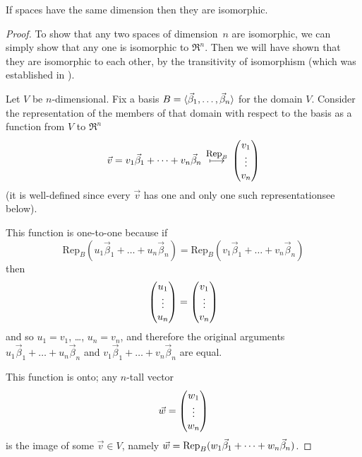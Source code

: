 \begin{lemma} \label{lem:EqDimImpIso}
If spaces have the same dimension then they are isomorphic. 
\end{lemma}

\begin{proof}
To show that any two spaces of dimension~$n$ are isomorphic, 
we can simply show that any one is isomorphic to $\Re^n$.
Then we will have shown that they are isomorphic to each other, 
by the transitivity of isomorphism 
(which was established in ).

Let $V$ be \( n \)-dimensional.
Fix a basis
\( B=\sequence{\vec{\beta}_1,\dots,\vec{\beta}_n} \) for the domain $V$.
Consider the representation of the 
members of that domain with respect to the basis as a function
from $V$ to $\Re^n$ 
\begin{equation*}
   \vec{v}=v_1\vec{\beta}_1+\dots+v_n\vec{\beta}_n
   \,\mapsunder{\text{\small Rep}_B}\,\colvec{v_1 \\ \vdots \\ v_n}
\end{equation*}
(it is well-defined since 
every \( \vec{v} \) 
has one and only one such representation\Dash see 
below).

This function is one-to-one because if
\begin{equation*}
   \text{Rep}_B(u_1\vec{\beta}_1+\dots+u_n\vec{\beta}_n)
     =\text{Rep}_B(v_1\vec{\beta}_1+\dots+v_n\vec{\beta}_n)
\end{equation*}
then
\begin{equation*}
  \colvec{u_1 \\ \vdots \\ u_n}
    =
  \colvec{v_1 \\ \vdots \\ v_n}
\end{equation*}
and so \( u_1=v_1 \), \ldots, $u_n=v_n$, and therefore the original arguments
\( u_1\vec{\beta}_1+\dots+u_n\vec{\beta}_n \) and 
\( v_1\vec{\beta}_1+\dots+v_n\vec{\beta}_n\) are equal.

This function is onto; any \( n \)-tall vector
\begin{equation*}
   \vec{w}=\colvec{w_1 \\ \vdots \\ w_n}
\end{equation*}
is the image of some \( \vec{v}\in V \), namely
\( \vec{w}=\rep{w_1\vec{\beta}_1+\dots+w_n\vec{\beta}_n}{B}  \).


\end{proof}
